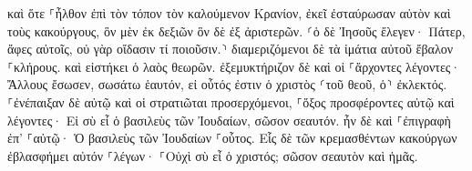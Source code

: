 \documentclass{openreader}
\begin{document}
καὶ ὅτε ⸀ἦλθον ἐπὶ τὸν τόπον τὸν καλούμενον Κρανίον, ἐκεῖ ἐσταύρωσαν αὐτὸν καὶ τοὺς κακούργους, ὃν μὲν ἐκ δεξιῶν ὃν δὲ ἐξ ἀριστερῶν. 
⸂ὁ δὲ Ἰησοῦς ἔλεγεν· Πάτερ, ἄφες αὐτοῖς, οὐ γὰρ οἴδασιν τί ποιοῦσιν.⸃ διαμεριζόμενοι δὲ τὰ ἱμάτια αὐτοῦ ἔβαλον ⸀κλήρους. 
καὶ εἱστήκει ὁ λαὸς θεωρῶν. ἐξεμυκτήριζον δὲ καὶ οἱ ⸀ἄρχοντες λέγοντες· Ἄλλους ἔσωσεν, σωσάτω ἑαυτόν, εἰ οὗτός ἐστιν ὁ χριστὸς ⸂τοῦ θεοῦ, ὁ⸃ ἐκλεκτός. 
⸀ἐνέπαιξαν δὲ αὐτῷ καὶ οἱ στρατιῶται προσερχόμενοι, ⸀ὄξος προσφέροντες αὐτῷ 
καὶ λέγοντες· Εἰ σὺ εἶ ὁ βασιλεὺς τῶν Ἰουδαίων, σῶσον σεαυτόν. 
ἦν δὲ καὶ ⸀ἐπιγραφὴ ἐπ’ ⸀αὐτῷ· Ὁ βασιλεὺς τῶν Ἰουδαίων ⸀οὗτος. 
Εἷς δὲ τῶν κρεμασθέντων κακούργων ἐβλασφήμει αὐτόν ⸀λέγων· ⸀Οὐχὶ σὺ εἶ ὁ χριστός; σῶσον σεαυτὸν καὶ ἡμᾶς. 
\end{document}
